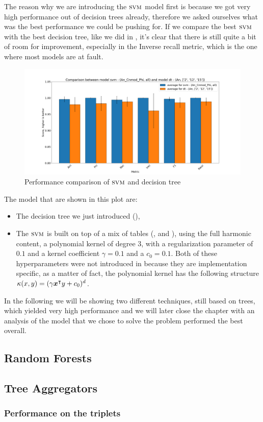 The reason why we are introducing the $\textsc{svm}$ model first is because we got very high performance out
of decision trees already, therefore we asked ourselves what was the best performance we could be
pushing for. If we compare the best $\textsc{svm}$ with the best decision tree, like we did in
, it's clear that there is still quite a bit of room for improvement, especially in the Inverse recall metric, which is the one where most models are at fault.
\begin{figure}[h!]
	\centering
	\includegraphics[width=\linewidth]{img/svm_vs_dt.png}
	\caption{Performance comparison of $\textsc{svm}$ and decision tree} \label{fig:svm-vs-dt}
\end{figure}
The model that are shown in this plot are:
\begin{itemize}
	\item The decision tree we just introduced (),
	\item The $\textsc{svm}$ is built on top of a mix of tables (\an, \cnmod and \phin), using the full
	      harmonic content, a polynomial kernel of degree $3$, with a regularization parameter
	      of $0.1$ and a kernel coefficient $\gamma = 0.1$ and a $c_0 = 0.1$. Both of these
	      hyperparameters were not introduced in  because they are
	      implementation specific, as a matter of fact, the polynomial kernel has the
	      following structure $\kappa(x, y) = (\gamma\boldsymbol{x}^\intercal y + c_0)^d$.
\end{itemize}

In the following we will be showing two different techniques, still based on trees, which yielded
very high performance and we will later close the chapter with an analysis of the model that we
chose to solve the problem performed the best overall.

\subsection{Random Forests}

\subsection{Tree Aggregators}

\subsubsection{Performance on the triplets}
